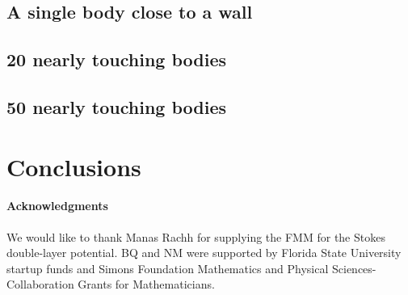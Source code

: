 \documentclass[preprint, 10pt]{elsarticle}
\begin{document}
\subsection{A single body close to a wall}

\subsection{20 nearly touching bodies}

\subsection{50 nearly touching bodies}

\section{Conclusions}
\label{s:conclusions}


\paragraph{\bf Acknowledgments} We would like to thank Manas Rachh for
supplying the FMM for the Stokes double-layer potential. BQ and NM were
supported by Florida State University startup funds and Simons
Foundation Mathematics and Physical Sciences-Collaboration Grants for
Mathematicians.

 

\end{document}
